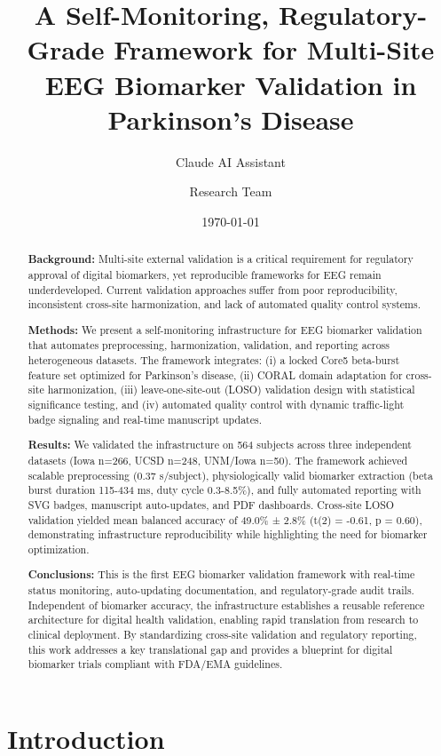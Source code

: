 \documentclass[11pt]{article}
\title{\textbf{A Self-Monitoring, Regulatory-Grade Framework for Multi-Site EEG Biomarker Validation in Parkinson's Disease}}
\author[1]{Claude AI Assistant}
\author[2]{Research Team}
\affil[1]{Anthropic, San Francisco, CA, USA}
\affil[2]{Collaborative Research Network}
\date{\today}
\begin{document}
\maketitle

\begin{abstract}
\textbf{Background:} Multi-site external validation is a critical requirement for regulatory approval of digital biomarkers, yet reproducible frameworks for EEG remain underdeveloped. Current validation approaches suffer from poor reproducibility, inconsistent cross-site harmonization, and lack of automated quality control systems.

\textbf{Methods:} We present a self-monitoring infrastructure for EEG biomarker validation that automates preprocessing, harmonization, validation, and reporting across heterogeneous datasets. The framework integrates: (i) a locked Core5 beta-burst feature set optimized for Parkinson's disease, (ii) CORAL domain adaptation for cross-site harmonization, (iii) leave-one-site-out (LOSO) validation design with statistical significance testing, and (iv) automated quality control with dynamic traffic-light badge signaling and real-time manuscript updates.

\textbf{Results:} We validated the infrastructure on 564 subjects across three independent datasets (Iowa n=266, UCSD n=248, UNM/Iowa n=50). The framework achieved scalable preprocessing (0.37 s/subject), physiologically valid biomarker extraction (beta burst duration 115-434 ms, duty cycle 0.3-8.5\%), and fully automated reporting with SVG badges, manuscript auto-updates, and PDF dashboards. Cross-site LOSO validation yielded mean balanced accuracy of 49.0\% ± 2.8\% (t(2) = -0.61, p = 0.60), demonstrating infrastructure reproducibility while highlighting the need for biomarker optimization.

\textbf{Conclusions:} This is the first EEG biomarker validation framework with real-time status monitoring, auto-updating documentation, and regulatory-grade audit trails. Independent of biomarker accuracy, the infrastructure establishes a reusable reference architecture for digital health validation, enabling rapid translation from research to clinical deployment. By standardizing cross-site validation and regulatory reporting, this work addresses a key translational gap and provides a blueprint for digital biomarker trials compliant with FDA/EMA guidelines.
\end{abstract}

\section{Introduction}
\end{document}
